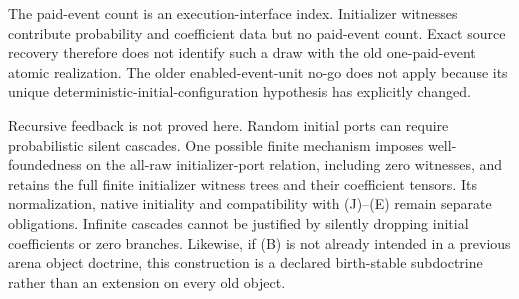\documentclass[11pt]{article}
\begin{document}
The paid-event count is an execution-interface index. Initializer witnesses contribute probability and coefficient data but no paid-event count. Exact source recovery therefore does not identify such a draw with the old one-paid-event atomic realization. The older enabled-event-unit no-go does not apply because its unique deterministic-initial-configuration hypothesis has explicitly changed.

Recursive feedback is not proved here. Random initial ports can require probabilistic silent cascades. One possible finite mechanism imposes well-foundedness on the all-raw initializer-port relation, including zero witnesses, and retains the full finite initializer witness trees and their coefficient tensors. Its normalization, native initiality and compatibility with (J)--(E) remain separate obligations. Infinite cascades cannot be justified by silently dropping initial coefficients or zero branches. Likewise, if (B) is not already intended in a previous arena object doctrine, this construction is a declared birth-stable subdoctrine rather than an extension on every old object.
\end{document}
